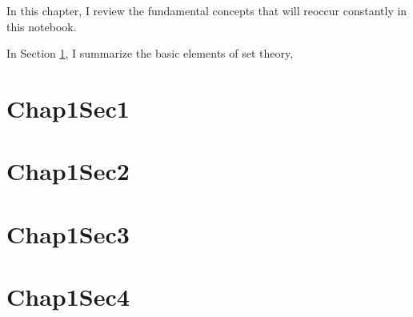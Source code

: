 \minitoc

\vspace{0.5cm}
In this chapter, I review the fundamental concepts that will reoccur constantly in this notebook.

In Section \ref{chap1:sec1}, I summarize the basic elements of set theory, 

\section{Chap1Sec1}\label{chap1:sec1}


\section{Chap1Sec2}\label{chap1:sec2}


\section{Chap1Sec3}\label{chap1:sec3}

\section{Chap1Sec4}\label{chap1:sec4}

